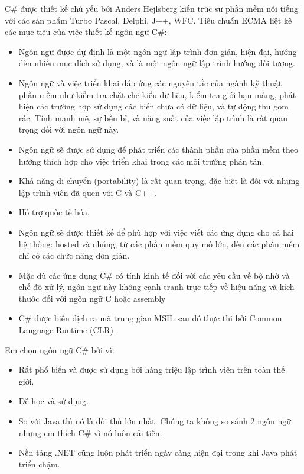 C\# được thiết kế chủ yếu bởi Anders Hejlsberg kiến trúc sư phần mềm nổi tiếng với các sản phẩm Turbo Pascal, Delphi, J++, WFC.
Tiêu chuẩn ECMA liệt kê các mục tiêu của việc thiết kế ngôn ngữ C\#:
\begin{itemize}
\item Ngôn ngữ được dự định là một ngôn ngữ lập trình đơn giản, hiện đại, hướng đến nhiều mục đích sử dụng, và là một ngôn ngữ lập trình hướng đối tượng.
\item Ngôn ngữ và việc triển khai đáp ứng các nguyên tắc của ngành kỹ thuật phần mềm như kiểm tra chặt chẽ kiểu dữ liệu, kiểm tra giới hạn mảng, phát hiện các trường hợp sử dụng các biến chưa có dữ liệu, và tự động thu gom rác. Tính mạnh mẽ, sự bền bỉ, và năng suất của việc lập trình là rất quan trọng đối với ngôn ngữ này.
\item Ngôn ngữ sẽ được sử dụng để phát triển các thành phần của phần mềm theo hướng thích hợp cho việc triển khai trong các môi trường phân tán.
\item Khả năng di chuyển (portability) là rất quan trọng, đặc biệt là đối với những lập trình viên đã quen với C và C++.
\item Hỗ trợ quốc tế hóa.
\item Ngôn ngữ sẽ được thiết kế để phù hợp với việc viết các ứng dụng cho cả hai hệ thống: hosted và nhúng, từ các phần mềm quy mô lớn, đến các phần mềm chỉ có các chức năng đơn giản.
\item Mặc dù các ứng dụng C\# có tính kinh tế đối với các yêu cầu về bộ nhớ và chế độ xử lý, ngôn ngữ này không cạnh tranh trực tiếp về hiệu năng và kích thước đối với ngôn ngữ C hoặc assembly
\item C\# được biên dịch ra mã trung gian MSIL sau đó thực thi bởi Common Language Runtime (CLR) \cite{2}.
\end{itemize}
\par
Em chọn ngôn ngữ C\# bởi vì:
\begin{itemize}
\item Rất phổ biến và được sử dụng bởi hàng triệu lập trình viên trên toàn thế giới.
\item Dễ học và sử dụng.
\item So với Java thì nó là đối thủ lớn nhất. Chúng ta không so sánh 2 ngôn ngữ nhưng em thích C\# vì nó luôn cải tiến.
\item Nền tảng .NET cũng luôn phát triển ngày càng hiện đại trong khi Java phát triển chậm.
\end{itemize}

